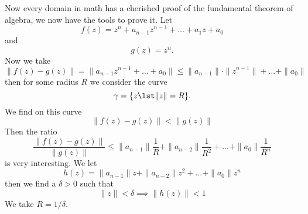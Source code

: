 Now every domain in math has a cherished proof of the fundamental
theorem of algebra, we now have the tools to prove it. Let
\begin{equation}
f(z) = z^{n}+a_{n-1}z^{n-1}+\dots+a_{1}z+a_{0}
\end{equation}
and
\begin{equation}
g(z)=z^{n}.
\end{equation}
Now we take
\begin{equation}
\|f(z)-g(z)\| =
\|a_{n-1}z^{n-1}+\dots+a_{0}\|\leq\|a_{n-1}\|\cdot\|z^{n-1}\|+\dots+\|a_{0}\|
\end{equation}
then for some radius $R$ we consider the curve 
\begin{equation}
\gamma=\{z\lst \|z\|=R\}.
\end{equation}
We find on this curve
\begin{equation}
\|f(z)-g(z)\|<\|g(z)\|
\end{equation}
Then the ratio
\begin{equation}
\frac{\|f(z)-g(z)\|}{\|g(z)\|}\leq \|a_{n-1}\|\frac{1}{R}+
\|a_{n-2}\|\frac{1}{R^{2}}+\dots+\|a_{0}\|\frac{1}{R^{n}}
\end{equation}
is very interesting. We let 
\begin{equation}
h(z)=\|a_{n-1}\|z+\|a_{n-2}\|z^{2}+\dots+\|a_{0}\|z^{n}
\end{equation}
then we find a $\delta>0$ such that
\begin{equation}
\|z\|<\delta\implies\|h(z)\|<1
\end{equation}
We take $R=1/\delta$.

